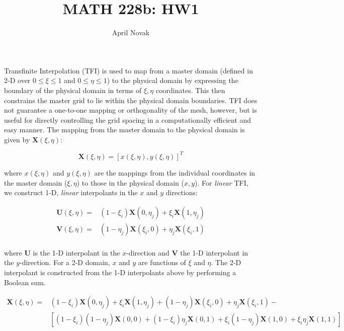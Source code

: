 \documentclass[10pt]{article}
\begin{document}
\title{MATH 228b: HW1}
\author{April Novak}

\maketitle

\section{}

Transfinite Interpolation (TFI) is used to map from a master domain (defined in 2-D over \(0\leq\xi\leq1\) and \(0\leq\eta\leq1\)) to the physical domain by expressing the boundary of the physical domain in terms of \(\xi,\eta\) coordinates. This then constrains the master grid to lie within the physical domain boundaries. TFI does not guarantee a one-to-one mapping or orthogonality of the mesh, however, but is useful for directly controlling the grid spacing in a computationally efficient and easy manner. The mapping from the master domain to the physical domain is given by \(\textbf{X}(\xi,\eta)\):

\begin{equation}
\textbf{X}(\xi,\eta)=\left\lbrack x(\xi,\eta), y(\xi,\eta)\right\rbrack^T
\end{equation}

where \(x(\xi,\eta)\) and \(y(\xi,\eta)\) are the mappings from the individual coordinates in the master domain (\(\xi,\eta\)) to those in the physical domain (\(x,y\)). For \textit{linear} TFI, we construct 1-D, \textit{linear} interpolants in the \(x\) and \(y\) directions:

\begin{equation}
\begin{aligned}
\textbf{U}(\xi,\eta)=& (1-\xi_i)\textbf{X}(0,\eta_j)+\xi_i\textbf{X}(1,\eta_j)\\
\textbf{V}(\xi,\eta)=& (1-\eta_j)\textbf{X}(\xi_i,0)+\eta_j\textbf{X}(\xi_i,1)\\
\end{aligned}
\end{equation}

where \(\textbf{U}\) is the 1-D interpolant in the \(x\)-direction and \(\textbf{V}\) the 1-D interpolant in the \(y\)-direction. For a 2-D domain, \(x\) and \(y\) are functions of \(\xi\) and \(\eta\). The 2-D interpolant is constructed from the 1-D interpolants above by performing a Boolean sum.

\begin{equation}
\begin{aligned}
\textbf{X}(\xi,\eta)=& (1-\xi_i)\textbf{X}(0,\eta_j)+\xi_i\textbf{X}(1,\eta_j) + (1-\eta_j)\textbf{X}(\xi_i,0)+\eta_j\textbf{X}(\xi_i,1) - \\
& \left\lbrack(1-\xi_i)(1-\eta_j)\textbf{X}(0,0)+(1-\xi_i)\eta_j\textbf{X}(0,1)+\xi_i(1-\eta_j)\textbf{X}(1,0)+\xi_i\eta_j\textbf{X}(1,1)\right\rbrack
\end{aligned}
\end{equation}
\end{document}
